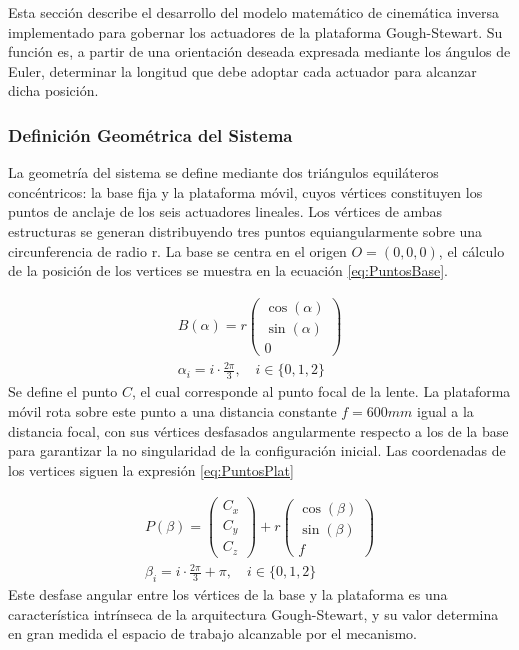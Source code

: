 Esta sección describe el desarrollo del modelo matemático de cinemática inversa implementado para gobernar los actuadores de la plataforma Gough-Stewart. Su función es, a partir de una orientación deseada expresada mediante los ángulos de Euler, determinar la longitud que debe adoptar cada actuador para alcanzar dicha posición. 

\subsubsection{Definición Geométrica del Sistema}\label{sec:Def_Geo}

La geometría del sistema se define mediante dos triángulos equiláteros concéntricos: la base fija y la plataforma móvil, cuyos vértices constituyen los puntos de anclaje de los seis actuadores lineales. Los vértices de ambas estructuras se generan distribuyendo tres puntos equiangularmente sobre una circunferencia de radio r. La base se centra en el origen $O=(0,0,0)$, el cálculo de la posición de los vertices se muestra en la ecuación \eqref{eq:PuntosBase}.

\begin{equation}
    \begin{gathered}
        B(\alpha) = r
        \begin{pmatrix}
            \cos(\alpha) \\
            \sin(\alpha) \\
            0
        \end{pmatrix}\\[6pt]
        \alpha_i = i \cdot \frac{2\pi}{3}, \quad i \in \{0,1,2\}
    \end{gathered}
    \label{eq:PuntosBase}
\end{equation}
Se define el punto $C$, el cual corresponde al punto focal de la lente. La plataforma móvil rota sobre este punto a una distancia constante $f=600mm$ igual a la distancia focal, con sus vértices desfasados angularmente respecto a los de la base para garantizar la no singularidad de la configuración inicial. Las coordenadas de los vertices siguen la expresión \eqref{eq:PuntosPlat}

\begin{equation}
    \begin{gathered}
        P(\beta) =
    		\begin{pmatrix}
		C_x \\
		C_y \\
		C_z
		\end{pmatrix}+r
        \begin{pmatrix}
            \cos(\beta) \\
            \sin(\beta) \\
            f
        \end{pmatrix}\\[6pt]
        \beta_i = i \cdot \frac{2\pi}{3}+\pi, \quad i \in \{0,1,2\}
    \end{gathered}
    \label{eq:PuntosPlat}
\end{equation}
Este desfase angular entre los vértices de la base y la plataforma es una característica intrínseca de la arquitectura Gough-Stewart, y su valor determina en gran medida el espacio de trabajo alcanzable por el mecanismo.


